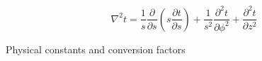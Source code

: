 \documentclass[11pt]{article}
\begin{document}
\[
\nabla ^ { 2 } t = \frac { 1 } { s } \frac { \partial } { \partial s } \left( s \frac { \partial t } { \partial s } \right) + \frac { 1 } { s ^ { 2 } } \frac { \partial ^ { 2 } t } { \partial \phi ^ { 2 } } + \frac { \partial ^ { 2 } t } { \partial z ^ { 2 } }
\]


\pagebreak


{\large \centerline{Physical constants and conversion factors}}
\def\npar{\par\medskip}
\def\vvec#1{\vec{#1}\,}
\def\rr{\vec{r}}
\def\vv{\vec{v}}
\def\aaa{\vec{a}}
\def\e#1{\vec{e}_{\rm #1}}
\def\ee#1{\vec{e}_{#1}}
\def\Q#1#2{\frac{\partial #1}{\partial #2}}
\def\QQ#1#2{\frac{\partial^2 #1}{\partial #2^2}}
\def\Qc#1#2#3{\left(\frac{\partial #1}{\partial #2}\right)_{#3}}
\def\LL{{\cal L}}
\def\RR{I\hspace{-1mm}R}
\def\NN{I\hspace{-1mm}N}
\def\TT{\mbox{\sfd T}}
\def\DD{\mbox{\sfd D}}
\def\half{\mbox{$\frac{1}{2}$}}
\def\kwart{\mbox{$\frac{1}{4}$}}
\def\av#1{\left\langle #1 \right\rangle}
\def\oiint{\int\hspace{-2ex}\int\hspace{-3ex}\bigcirc~}
\def\iint{\int\hspace{-1.5ex}\int}
\def\iiint{\int\hspace{-1.5ex}\int\hspace{-1.5ex}\int}
\def\dd{d\hspace{-1ex}\rule[1.25ex]{2mm}{0.4pt}}
\def\lrarrow{~\lower.2ex\hbox{$\rightarrow$}\kern-2.4ex\raise.7ex\hbox{$\leftarrow$}~}
\def\rlarrow{~\lower.2ex\hbox{$\leftarrow$}\kern-2.3ex\raise.7ex\hbox{$\rightarrow$}~}
\def\ne{n_{\rm e}}
\def\ni{n_{\rm i}}
\def\no{n_{\rm 0}}
\def\me{m_{\rm e}}
\def\mi{m_{\rm i}}
\def\Te{T_{\rm e}}
\def\Ti{T_{\rm i}}
\end{document}
